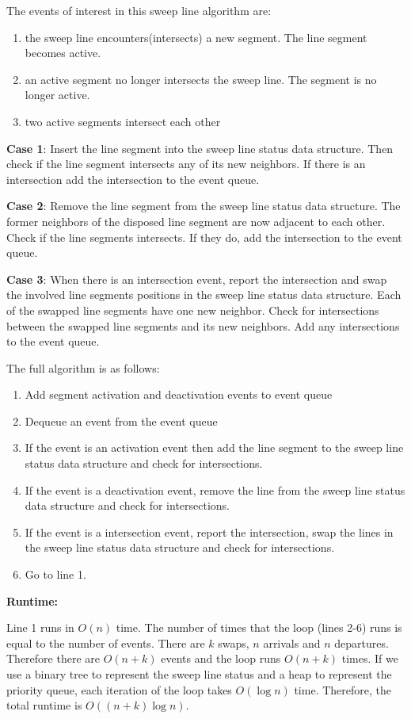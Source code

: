 \documentclass{article}
\begin{document}
The events of interest in this sweep line algorithm are:
\begin{enumerate}
\item the sweep line encounters(intersects) a new segment. The line segment becomes active.
\item an active segment no longer intersects the sweep line. The segment is no longer active.
\item two active segments intersect each other
\end{enumerate}


\textbf{Case 1}: Insert the line segment into the sweep line status data structure. Then check if the line segment intersects any of its new neighbors. If there is an intersection add the intersection to the event queue. 

\textbf{Case 2}: Remove the line segment from the sweep line status data structure. The former neighbors of the disposed line segment are now adjacent to each other. Check if the line segments intersects. If they do, add the intersection to the event queue. 

\textbf{Case 3}: When there is an intersection event, report the intersection and swap the involved line segments positions in the sweep line status data structure.  Each of the swapped line segments have one new neighbor. Check for intersections between the swapped line segments and its new neighbors. Add any intersections to the event queue. 

The full algorithm is as follows:
\begin{enumerate}
\item Add segment activation and deactivation events to event queue
\item Dequeue an event from the event queue
\item If the event is an activation event then add the line segment to the sweep line status data structure and check for intersections.
\item If the event is a deactivation event, remove the line from the sweep line status data structure and check for intersections. 
\item If the event is a intersection event, report the intersection, swap the lines in the sweep line status data structure and check for intersections. 
\item Go to line 1.
\end{enumerate}


\textbf{Runtime:}

Line 1 runs in $O(n)$ time. The number of times that the loop (lines 2-6) runs is equal to the number of events. There are $k$ swaps, $n$ arrivals and $n$ departures. Therefore there are $O(n+k)$ events and the loop runs  $O(n+k)$ times. If we use a binary tree to represent the sweep line status and a heap to represent the priority queue, each iteration of the loop takes $O(\log n)$ time. Therefore, the total runtime is $O((n+k)\log n)$.
\end{document}
